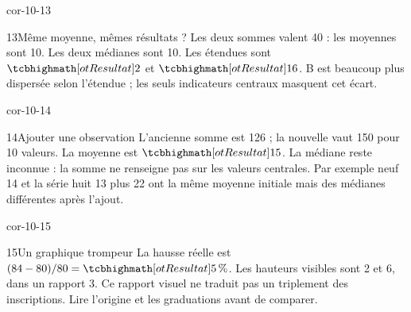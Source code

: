 \begin{blocLivre}{cor-10-13}\begin{corrige}{13}{Même moyenne, mêmes résultats ?}
Les deux sommes valent 40 : les moyennes sont 10. Les deux médianes sont 10. Les étendues sont $\res2$ et $\res{16}$. B est beaucoup plus dispersée selon l’étendue ; les seuls indicateurs centraux masquent cet écart.
\end{corrige}\end{blocLivre}
\begin{blocLivre}{cor-10-14}\begin{corrige}{14}{Ajouter une observation}
L’ancienne somme est 126 ; la nouvelle vaut 150 pour 10 valeurs. La moyenne est $\res{15}$. La médiane reste inconnue : la somme ne renseigne pas sur les valeurs centrales. Par exemple neuf 14 et la série huit 13 plus 22 ont la même moyenne initiale mais des médianes différentes après l’ajout.
\end{corrige}\end{blocLivre}
\begin{blocLivre}{cor-10-15}\begin{corrige}{15}{Un graphique trompeur}
La hausse réelle est $(84-80)/80=\res{5\,\%}$. Les hauteurs visibles sont 2 et 6, dans un rapport 3. Ce rapport visuel ne traduit pas un triplement des inscriptions. Lire l’origine et les graduations avant de comparer.
\label{fig-cor-10-15}
\end{corrige}\end{blocLivre}
